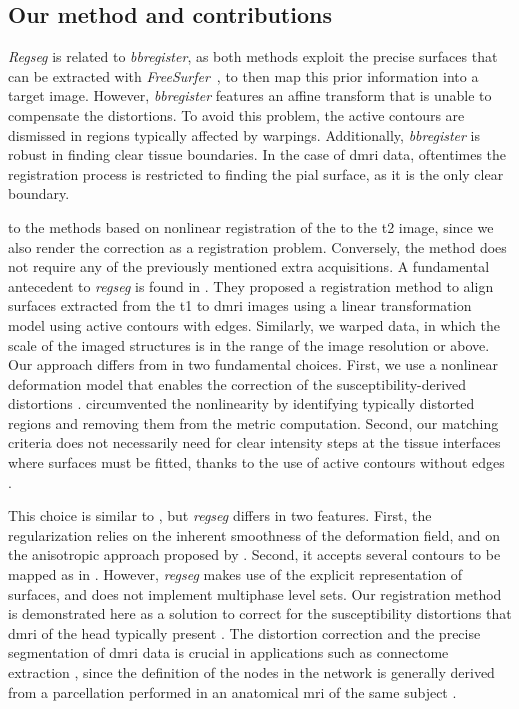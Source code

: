 \subsection{Our method and contributions}
\label{sec:our_method}
\emph{Regseg} is related to \emph{bbregister}, as both methods exploit the precise
  surfaces that can be extracted with \emph{FreeSurfer}~\citep{fischl_freesurfer_2012},
  to then map this prior information into a target image.
However, \emph{bbregister} features an affine transform that is unable to compensate the
  distortions.
To avoid this problem, the active contours are dismissed in regions typically affected by
  warpings.
Additionally, \emph{bbregister} is robust in finding clear tissue boundaries.
In the case of \gls*{dmri} data, oftentimes the registration process is restricted to finding
  the pial surface, as it is the only clear boundary.

to the methods based on nonlinear registration of the
  to the \gls*{t2} image, since we also render the correction as a
  registration problem.
Conversely, the method does not require any of the previously mentioned extra acquisitions.
A fundamental antecedent to \emph{regseg} is found in .
They proposed a registration method to align surfaces extracted from the \gls*{t1}
  to \gls*{dmri} images using a linear transformation model using active contours
  with edges.
Similarly, we  warped data, in which the scale of the
  imaged structures is in the range of the image resolution or above.
Our approach differs from \citep{greve_accurate_2009} in two fundamental choices.
First, we use a nonlinear deformation model that enables the correction of the
  susceptibility-derived distortions \citep{jezzard_correction_1995}.
\cite{greve_accurate_2009} circumvented the nonlinearity by identifying typically
  distorted regions and removing them from the metric computation.
Second, our matching criteria does not necessarily need for clear intensity
  steps at the tissue interfaces where surfaces must be fitted, thanks to the use of
  active contours without edges \citep{chan_active_2001}.


This choice is similar to \citep{guyader_combined_2011}, but \emph{regseg} differs in two
  features.
First, the regularization relies on the inherent smoothness of the deformation field,
  and on the anisotropic approach proposed by \cite{nagel_investigation_1986}.
Second, it accepts several contours to be mapped as in \citep{gorthi_active_2011}.
However, \emph{regseg} makes use of the explicit representation of surfaces, and
  does not implement multiphase level sets.
Our registration method is demonstrated here as a solution to correct for the susceptibility
  distortions that \gls*{dmri} of the head typically present \citep{jezzard_correction_1995}.
The distortion correction and the precise segmentation of \gls*{dmri} data is crucial in
	applications such as connectome extraction \citep{craddock_imaging_2013}, since the
  definition of the nodes in the network is generally derived from a parcellation performed in
  an anatomical \gls*{mri} of the same subject \citep{daducci_connectome_2012}.



